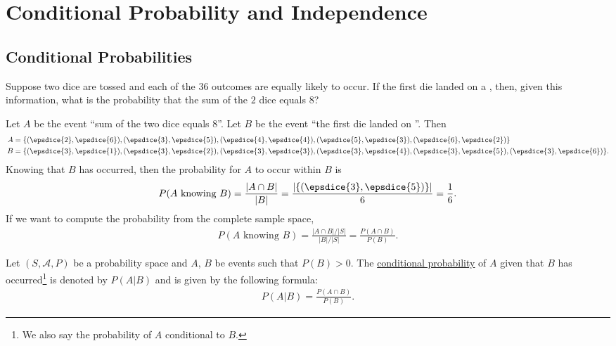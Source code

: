 \chapter{Conditional Probability and Independence}


\section{Conditional Probabilities}

\begin{example}\label{Ex:DiceConditional}
Suppose two dice are tossed and each of the 36 outcomes are equally likely to occur. If the first die landed on a , then, given this information, what is the probability that the sum of the $2$ dice equals $8$?

Let $A$ be the event ``sum of the two dice equals 8''. Let $B$ be the event ``the first die landed on ''. Then 
	\begin{align*}
	A &= \{ (\epsdice{2} , \epsdice{6} ) , (\epsdice{3} , \epsdice{5} ) , (\epsdice{4} , \epsdice{4} ) , (\epsdice{5} , \epsdice{3} ) , (\epsdice{6} , \epsdice{2} ) \}\\
	B &= \{ (\epsdice{3}, \epsdice{1} ) , (\epsdice{3} , \epsdice{2}) , (\epsdice{3},\epsdice{3}) , (\epsdice{3}, \epsdice{4}) , (\epsdice{3}, \epsdice{5}) , (\epsdice{3}, \epsdice{6}) \} .
	\end{align*}
Knowing that $B$ has occurred, then the probability for $A$ to occur within $B$ is
	\begin{align*}
	P (A \text{ knowing } B) = \frac{|A \cap B|}{|B|} = \frac{| \{ (\epsdice{3} , \epsdice{5} ) \}|}{6} = \frac{1}{6} .
	\end{align*}
If we want to compute the probability from the complete sample space, 
	\begin{align*}
	P ( A \text{ knowing } B ) = \frac{|A \cap B| / |S|}{|B| / |S|} = \frac{P (A \cap B )}{P (B)}.	\tag*{$\triangle$}
	\end{align*}
\end{example}

\begin{definition}
Let $(S , \mathcal{A} , P )$ be a probability space and $A$, $B$ be events such that $P (B) > 0$. The \underline{conditional probability} of $A$ given that $B$ has occurred\footnote{We also say the probability of $A$ conditional to $B$.} is denoted by $P (A | B )$ and is given by the following formula:
	\begin{align}
	P (A | B ) = \frac{P (A \cap B )}{P ( B)} . \label{Eq:ConditionalFormula}
	\end{align}
\end{definition}

